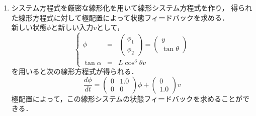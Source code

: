 \begin{enumerate}
\begin{equation}
\begin{array}{cc}
     0 & 1.0 \\
     0 & 0
   \end{array} \right) \left(\begin{array}{c}
     y \\
     \theta 
   \end{array} \right) + \left(\begin{array}{c}
     0 \\
     \frac{1}{0.4}
   \end{array} \right) \tan \alpha
\end{equation}
LQ 制御と極配置によって，この線形システムの状態フィードバックを求めるこ
	   とができる．
%
 \item 
       システム方程式を厳密な線形化を用いて線形システム方程式を作り，
       得られた線形方程式に対して極配置によって状態フィードバックを求める．\\
       新しい状態$\phi$と新しい入力$v$として，
\begin{equation*}
 \left\{
 \begin{array}{rcl}
  \phi &=&
   \left(
    \begin{array}{c}
     \phi_1 \\
     \phi_2
    \end{array}
   \right) = 
   \left(
    \begin{array}{c}
     y \\
     \tan \theta
    \end{array}
   \right) \\
  \tan \alpha &=& L \cos ^3 \theta v
 \end{array}
 \right.
\end{equation*}
を用いると次の線形方程式が得られる．
\begin{equation}
 \frac{d \phi}{dt} =
  \left(
   \begin{array}{cc}
    0 & 1.0 \\
    0 & 0
   \end{array}
  \right) \phi +
  \left(
   \begin{array}{c}
    0 \\
    1.0
   \end{array}
  \right) v
\end{equation}
極配置によって，この線形システムの状態フィードバックを求めることができる．
\end{enumerate}
%
\newpage
%
